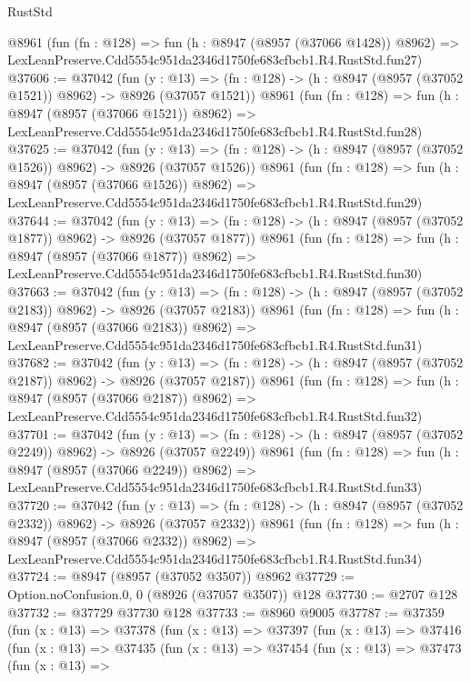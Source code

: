 \begin{lexlean}{RustStd}
\begin{coremodule}
    @8961
    (fun (fn : @128) =>
    fun (h : @8947 (@8957 (@37066 @1428)) @8962) =>
    LexLeanPreserve.Cdd5554c951da2346d1750fe683cfbcb1.R4.RustStd.fun27)
@37606 := @37042
    (fun (y : @13) =>
    (fn : @128) -> (h : @8947 (@8957 (@37052 @1521)) @8962) -> @8926 (@37057 @1521))
    @8961
    (fun (fn : @128) =>
    fun (h : @8947 (@8957 (@37066 @1521)) @8962) =>
    LexLeanPreserve.Cdd5554c951da2346d1750fe683cfbcb1.R4.RustStd.fun28)
@37625 := @37042
    (fun (y : @13) =>
    (fn : @128) -> (h : @8947 (@8957 (@37052 @1526)) @8962) -> @8926 (@37057 @1526))
    @8961
    (fun (fn : @128) =>
    fun (h : @8947 (@8957 (@37066 @1526)) @8962) =>
    LexLeanPreserve.Cdd5554c951da2346d1750fe683cfbcb1.R4.RustStd.fun29)
@37644 := @37042
    (fun (y : @13) =>
    (fn : @128) -> (h : @8947 (@8957 (@37052 @1877)) @8962) -> @8926 (@37057 @1877))
    @8961
    (fun (fn : @128) =>
    fun (h : @8947 (@8957 (@37066 @1877)) @8962) =>
    LexLeanPreserve.Cdd5554c951da2346d1750fe683cfbcb1.R4.RustStd.fun30)
@37663 := @37042
    (fun (y : @13) =>
    (fn : @128) -> (h : @8947 (@8957 (@37052 @2183)) @8962) -> @8926 (@37057 @2183))
    @8961
    (fun (fn : @128) =>
    fun (h : @8947 (@8957 (@37066 @2183)) @8962) =>
    LexLeanPreserve.Cdd5554c951da2346d1750fe683cfbcb1.R4.RustStd.fun31)
@37682 := @37042
    (fun (y : @13) =>
    (fn : @128) -> (h : @8947 (@8957 (@37052 @2187)) @8962) -> @8926 (@37057 @2187))
    @8961
    (fun (fn : @128) =>
    fun (h : @8947 (@8957 (@37066 @2187)) @8962) =>
    LexLeanPreserve.Cdd5554c951da2346d1750fe683cfbcb1.R4.RustStd.fun32)
@37701 := @37042
    (fun (y : @13) =>
    (fn : @128) -> (h : @8947 (@8957 (@37052 @2249)) @8962) -> @8926 (@37057 @2249))
    @8961
    (fun (fn : @128) =>
    fun (h : @8947 (@8957 (@37066 @2249)) @8962) =>
    LexLeanPreserve.Cdd5554c951da2346d1750fe683cfbcb1.R4.RustStd.fun33)
@37720 := @37042
    (fun (y : @13) =>
    (fn : @128) -> (h : @8947 (@8957 (@37052 @2332)) @8962) -> @8926 (@37057 @2332))
    @8961
    (fun (fn : @128) =>
    fun (h : @8947 (@8957 (@37066 @2332)) @8962) =>
    LexLeanPreserve.Cdd5554c951da2346d1750fe683cfbcb1.R4.RustStd.fun34)
@37724 := @8947 (@8957 (@37052 @3507)) @8962
@37729 := Option.noConfusion.{0, 0} (@8926 (@37057 @3507)) @128
@37730 := @2707 @128
@37732 := @37729 @37730 @128
@37733 := @8960 @9005
@37787 := @37359
    (fun (x : @13) =>
    @37378
      (fun (x : @13) =>
      @37397
        (fun (x : @13) =>
        @37416
          (fun (x : @13) =>
          @37435
            (fun (x : @13) =>
            @37454
              (fun (x : @13) =>
              @37473
                (fun (x : @13) =>

\end{coremodule}
\end{lexlean}
